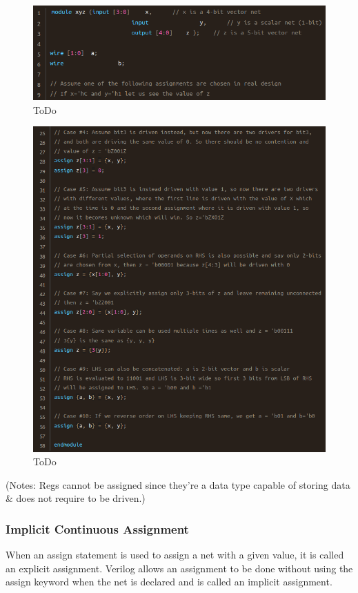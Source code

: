 \documentclass{article}
\begin{document}
	\begin{figure}[H]
		\includegraphics[width=\linewidth]{VerilogPics/figure_33.png}
		\caption{ToDo}
		\label{ToDo}
	\end{figure}
	\begin{figure}[H]
		\includegraphics[width=\linewidth]{VerilogPics/figure_34.png}
		\caption{ToDo}
		\label{ToDo}
	\end{figure}

	(Notes: Regs cannot be assigned since they're a data type capable of storing data \& does not require to be driven.)

	\subsubsection{Implicit Continuous Assignment}
	When an assign statement is used to assign a net with a given value, it is called an explicit assignment. Verilog allows an assignment to be done without using the assign keyword when the net is
	declared and is called an implicit assignment.
\end{document}
